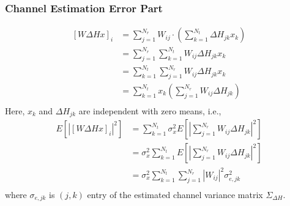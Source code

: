\documentclass{article}
\begin{document}
\subsubsection{Channel Estimation Error Part}
\begin{equation}
\begin{split}
[W\Delta Hx]_i &= \sum_{j=1}^{N_r}W_{ij}\cdot(\sum_{k=1}^{N_t}\Delta H_{jk}x_k)\\
&= \sum_{j=1}^{N_r}\sum_{k=1}^{N_t}W_{ij}\Delta H_{jk}x_k\\
&= \sum_{k=1}^{N_t}\sum_{j=1}^{N_r}W_{ij}\Delta H_{jk}x_k\\
&= \sum_{k=1}^{N_t} x_k (\sum_{j=1}^{N_r}W_{ij}\Delta H_{jk})\\
\end{split}
\end{equation}
Here, $x_k$ and $\Delta H_{jk}$ are independent with zero means, i.e.,
\begin{equation}
\begin{split}
E[|[W\Delta Hx]_i|^2] &= \sum_{k=1}^{N_t} \sigma_x^2 E\left[\left|\sum_{j=1}^{N_r}W_{ij}\Delta H_{jk}\right|^2\right] \\
&= \sigma_x^2 \sum_{k=1}^{N_t} E\left[\left|\sum_{j=1}^{N_r}W_{ij}\Delta H_{jk}\right|^2\right] \\
&= \sigma_x^2 \sum_{k=1}^{N_t} \sum_{j=1}^{N_r}|W_{ij}|^2 \sigma_{e,jk}^2 \\
\end{split}
\end{equation}
where $\sigma_{e,jk}$ is $(j,k)$ entry of the estimated channel variance matrix $\Sigma_{\Delta H}$.
\end{document}

